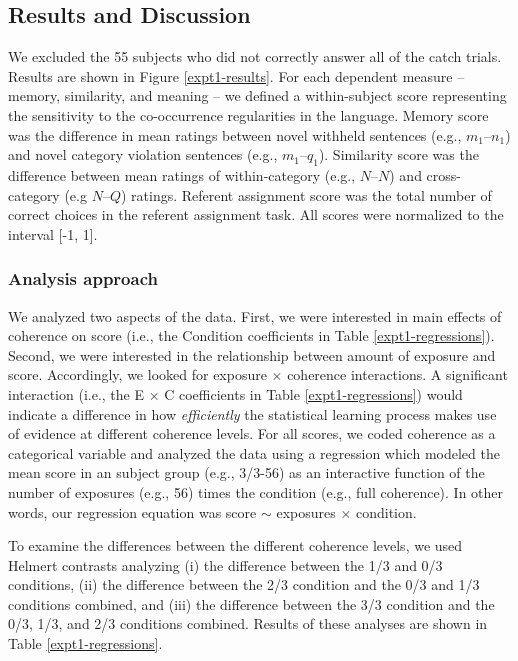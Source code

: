 \documentclass[man,floatsintext]{apa6}
\begin{document}
\subsection{Results and Discussion} We excluded the 55 subjects who
did not correctly answer all of the catch trials. Results are shown in
Figure \ref{expt1-results}. For each dependent measure -- memory,
similarity, and meaning -- we defined a within-subject score
representing the sensitivity to the co-occurrence regularities in the
language. Memory score was the difference in mean ratings between
novel withheld sentences (e.g., $m_1$--$n_1$) and novel category
violation sentences (e.g., $m_1$--$q_1$). Similarity score was the
difference between mean ratings of within-category (e.g., $N$--$N$)
and cross-category (e.g $N$--$Q$) ratings. Referent assignment score
was the total number of correct choices in the referent assignment
task. All scores were normalized to the interval [-1, 1].

\subsubsection{Analysis approach} We analyzed two aspects of the
data. First, we were interested in main effects of coherence on score
(i.e., the Condition coefficients in Table
\ref{expt1-regressions}). Second, we were interested in the
relationship between amount of exposure and score. Accordingly, we
looked for exposure $\times$ coherence interactions. A significant
interaction (i.e., the E $\times$ C coefficients in Table
\ref{expt1-regressions}) would indicate a difference in how
\emph{efficiently} the statistical learning process makes use of
evidence at different coherence levels. For all scores, we coded
coherence as a categorical variable and analyzed the data using a
regression which modeled the mean score in an subject group (e.g.,
3/3-56) as an interactive function of the number of exposures (e.g.,
56) times the condition (e.g., full coherence). In other words, our
regression equation was score $\sim$ exposures $\times$ condition.

To examine the differences between the different coherence levels, we
used Helmert contrasts analyzing (i) the difference between the 1/3
and 0/3 conditions, (ii) the difference between the 2/3 condition and
the 0/3 and 1/3 conditions combined, and (iii) the difference between
the 3/3 condition and the 0/3, 1/3, and 2/3 conditions
combined. Results of these analyses are shown in Table
\ref{expt1-regressions}.
\end{document}
